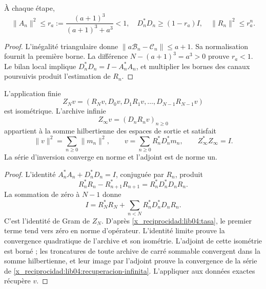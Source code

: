 \begin{lemma}
\label{x_reciprocidad:lib04:lem-tasa}
À chaque étape,
\begin{equation}
 \|A_n\|^2\leq r_a:={\frac{(a+1)^3}{(a+1)^3+a^3}}<1,
 \quad D_n^*D_n\geq(1-r_a)I,
 \quad\|R_n\|^2\leq r_a^n.
 \label{x_reciprocidad:lib04:tasa}
\end{equation}
\end{lemma}

\begin{proof}
L'inégalité triangulaire donne \(\|a\mathcal B_n-\mathcal C_n\|\leq a+1\). Sa normalisation fournit la première borne. La différence \(N-(a+1)^3=a^3>0\) prouve \(r_a<1\). Le bilan local implique \(D_n^*D_n=I-A_n^*A_n\), et multiplier les bornes des canaux poursuivis produit l'estimation de \(R_n\).
\end{proof}

\begin{theorem}
\label{x_reciprocidad:lib04:teo-archivo}
L’application finie
\begin{equation}
 Z_Nv=(R_Nv,D_0v,D_1R_1v,\ldots,D_{N-1}R_{N-1}v)
 \label{x_reciprocidad:lib04:zn}
\end{equation}
est isométrique. L’archive infinie
\begin{equation}
 Z_\infty v=(D_nR_nv)_{n\geq0}
 \label{x_reciprocidad:lib04:zinfty}
\end{equation}
appartient à la somme hilbertienne des espaces de sortie et satisfait
\begin{equation}
 \|v\|^2=\sum_{n\geq0}\|m_n\|^2,\qquad
 v=\sum_{n\geq0}R_n^*D_n^*m_n,
 \qquad Z_\infty^*Z_\infty=I.
 \label{x_reciprocidad:lib04:recuperacion-infinita}
\end{equation}
La série d’inversion converge en norme et l’adjoint est de norme un.
\end{theorem}

\begin{proof}
L’identité \(A_n^*A_n+D_n^*D_n=I\), conjuguée par \(R_n\),
produit
\[
 R_n^*R_n-R_{n+1}^*R_{n+1}=R_n^*D_n^*D_nR_n.
\]
La sommation de zéro à \(N-1\) donne
\begin{equation}
 I=R_N^*R_N+\sum_{n<N}R_n^*D_n^*D_nR_n.
 \label{x_reciprocidad:lib04:telescopia}
\end{equation}
C'est l'identité de Gram de \(Z_N\). D'après \eqref{x_reciprocidad:lib04:tasa}, le premier terme tend vers zéro en norme d'opérateur. L'identité limite prouve la convergence quadratique de l'archive et son isométrie. L'adjoint de cette isométrie est borné ; les troncatures de toute archive de carré sommable convergent dans la somme hilbertienne, et leur image par l'adjoint prouve la convergence de la série de \eqref{x_reciprocidad:lib04:recuperacion-infinita}. L'appliquer aux données exactes récupère \(v\).
\end{proof}

